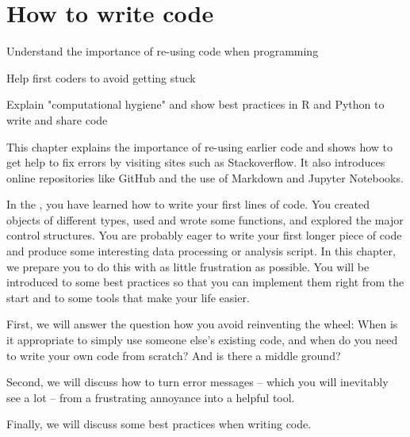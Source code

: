 \chapter{How to write code}
\label{chap:worldcode}

\begin{abstract}{Abstract}
  
Programming is no longer a solitary activity, and almost all questions, problems, and error messages have been encountered and solved before. This chapter explains the most common forms of collaboration and sources of outside help, as well as giving best practices on how to write and share code yourself.
\end{abstract}


\begin{objectives}
\item Understand the importance of re-using code when programming
\item Help first coders to avoid getting stuck
\item Explain "computational hygiene" and show best practices in R and Python to write and share code
\end{objectives}

\begin{feature}
This chapter explains the importance of re-using earlier code and shows how to get help to fix errors by visiting sites such as Stackoverflow. It also introduces online repositories like GitHub and the use of Markdown and Jupyter Notebooks.
\end{feature}

In the , you have learned how to write
your first lines of code.  You created objects of different types,
used and wrote some functions, and explored the major control structures.
You are probably eager to write your first longer piece of code and
produce some interesting data processing or analysis script. In this
chapter, we prepare you to do this with as little frustration as possible.
You will be introduced to some best practices so that you can implement
them right from the start and to some tools that make your life easier.

First, we will answer the question how you avoid reinventing
the wheel: When is it appropriate to simply use someone else's existing code, and
when do you need to write your own code from scratch? And is there a middle ground?

Second, we will discuss how to turn error messages -- which you will inevitably
see a lot -- from a frustrating annoyance into a helpful tool.

Finally, we will discuss some best practices when writing code.






